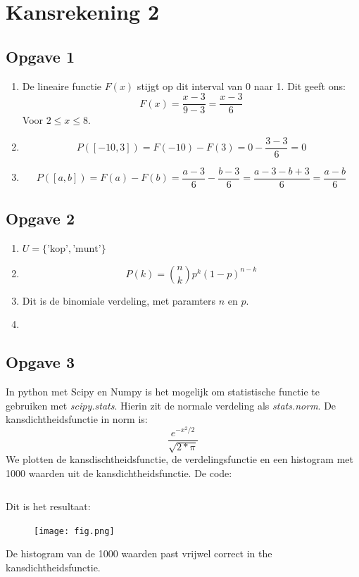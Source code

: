 \documentclass[a4paper,12px]{article}
\begin{document}


\section{Kansrekening 2}
\subsection{Opgave 1}
    \begin{enumerate}[label=(\alph*)]
        \item De lineaire functie $F(x)$ stijgt op dit interval van 0 naar 1. Dit geeft ons:
        \begin{equation}
            F(x)=\dfrac{x-3}{9-3}=\dfrac{x-3}{6}
        \end{equation}
        Voor $2\leq x \leq 8$.
        \item
            \begin{equation}
                P([-10,3])=F(-10)-F(3)=0-\dfrac{3-3}{6}=0
            \end{equation}
        \item
            \begin{equation}
                P([a,b])=F(a)-F(b)=\dfrac{a-3}{6}-\dfrac{b-3}{6}=\dfrac{a-3-b+3}{6}=\dfrac{a-b}{6}
            \end{equation}
    \end{enumerate}
\subsection{Opgave 2}
\begin{enumerate}[label=(\alph*)]
        \item $U=\{\text{'kop'},\text{'munt'}\}$
        \item
            \begin{equation}
                P(k)=\binom{n}{k}p^k(1-p)^{n-k}
            \end{equation}
        \item Dit is de binomiale verdeling, met paramters $n$ en $p$.
        \item
            \inputminted{python}{2d.py}
    \end{enumerate}
\subsection{Opgave 3}
In python met Scipy en Numpy is het mogelijk om statistische functie te
 gebruiken met \textit{scipy.stats}. Hierin zit de normale verdeling als
 \textit{stats.norm}. De kansdichtheidsfunctie in norm is:
\begin{equation}
	\dfrac{e^{-x^2/2}}{\sqrt{2*\pi}}
\end{equation}
We plotten de kansdischtheidsfunctie, de verdelingsfunctie en een histogram
 met 1000 waarden uit de kansdichtheidsfunctie. De code:
\inputminted{python}{3.py}
Dit is het resultaat:
\begin{figure}[!h]
    \centering
    \texttt{[image: fig.png]}
\end{figure}
\FloatBarrier
De histogram van de 1000 waarden past vrijwel correct in the
 kansdichtheidsfunctie.
\end{document}
